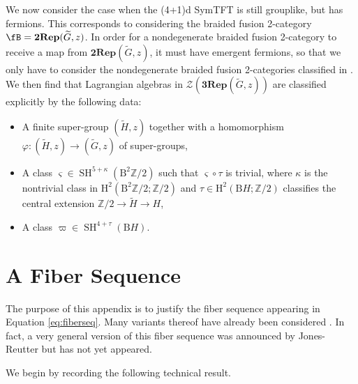 \documentclass[11pt,reqno]{amsart}
\newcommand{\Z}{\mathbb{Z}}
\DeclareMathOperator{\SH}{SH}
\newcommand{\cZ}{\mathcal{Z}}
\newcommand{\rH}{\mathrm{H}}
\newcommand{\rB}{\mathrm{B}}
\numberwithin{equation}{section}
\theoremstyle{plain}
\theoremstyle{definition}
\begin{document}
We now consider the case when the (4+1)d SymTFT is still grouplike, but has fermions.
This corresponds to considering the braided fusion 2-category $\fB = \mathbf{2Rep}(\widetilde{G},z)$. 
In order for a nondegenerate braided fusion 2-category to receive a map from $\mathbf{2Rep}(\widetilde{G},z)$, it must have emergent fermions, so that we only have to consider the nondegenerate braided fusion 2-categories classified in .
We then find that Lagrangian algebras in $\cZ(\mathbf{3Rep}(\widetilde{G},z))$ are classified explicitly by the following data:
\begin{itemize}
    \item A finite super-group $(\widetilde{H},z)$ together with a homomorphism $\varphi: (\widetilde{H},z)\rightarrow (\widetilde{G},z)$ of super-groups,
    \item A class $\varsigma \in \SH^{5+\kappa}(\rB^2\mathbb{Z}/2)$ such that $\varsigma\circ\tau$ is trivial, where $\kappa$ is the nontrivial class in $\rH^2(\rB^2\mathbb{Z}/2;\mathbb{Z}/2)$ and $\tau\in \rH^2(\rB H;\Z/2)$ classifies the central extension $\mathbb{Z}/2\rightarrow \widetilde{H}\rightarrow H$,
    \item A class $\varpi\in\SH^{4+ \tau}(\rB H)$.
\end{itemize}

\appendix

\section{A Fiber Sequence}\label{sec:fiber}

The purpose of this appendix is to justify the fiber sequence appearing in Equation \eqref{eq:fiberseq}.
Many variants thereof have already been considered \cite{GJS,davydov2021braided,JF2,Bhardwaj:2024xcx,Sa}.
In fact, a very general version of this fiber sequence was announced by Jones-Reutter but has not yet appeared.

We begin by recording the following technical result.
\end{document}
